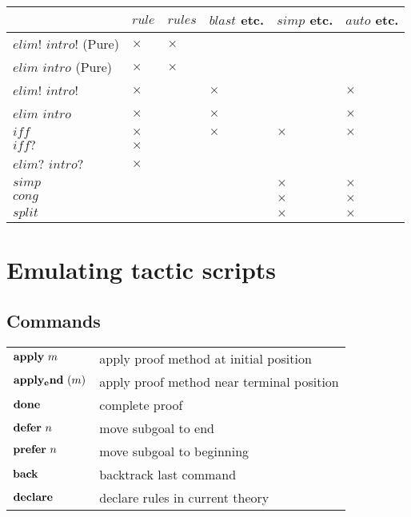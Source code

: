\begin{tabular}{l|lllll}
                          & $rule$   & $rules$  & $blast$ etc. & $simp$ etc. & $auto$ etc. \\
  \hline
  $elim!$ $intro!$ (Pure) & $\times$ & $\times$ \\
  $elim$ $intro$ (Pure)   & $\times$ & $\times$ \\
  $elim!$ $intro!$        & $\times$ &          & $\times$     &             & $\times$ \\
  $elim$ $intro$          & $\times$ &          & $\times$     &             & $\times$ \\
  $iff$                   & $\times$ &          & $\times$     & $\times$    & $\times$ \\
  $iff?$                  & $\times$ \\
  $elim?$ $intro?$        & $\times$ \\
  $simp$                  &          &          &              & $\times$    & $\times$ \\
  $cong$                  &          &          &              & $\times$    & $\times$ \\
  $split$                 &          &          &              & $\times$    & $\times$ \\
\end{tabular}


\section{Emulating tactic scripts}

\subsection{Commands}

\begin{tabular}{ll}
  $\APPLY{m}$ & apply proof method at initial position \\
  ${\mathord{\mathbf{apply_end}}}~(m)$ & apply proof method near terminal position \\
  ${\mathord{\mathbf{done}}}$ & complete proof \\
  ${\mathord{\mathbf{defer}}}~n$ & move subgoal to end \\
  ${\mathord{\mathbf{prefer}}}~n$ & move subgoal to beginning \\
  ${\mathord{\mathbf{back}}}$ & backtrack last command \\
  ${\mathord{\mathbf{declare}}}$ & declare rules in current theory \\
\end{tabular}

